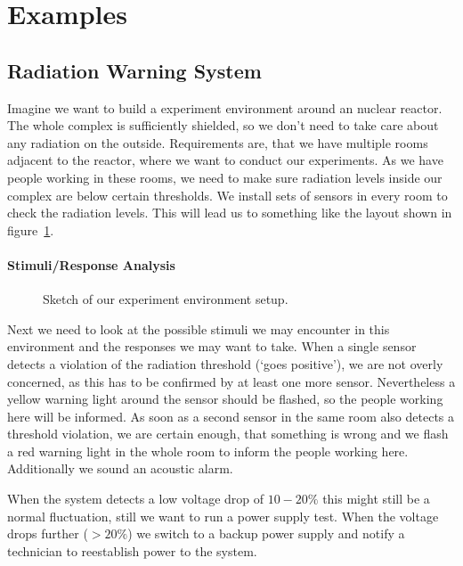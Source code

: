 \documentclass[10pt,a4paper,titlepage,draft]{article} %
\begin{document}
\section{Examples}

\subsection{Radiation Warning System}
Imagine we want to build a experiment environment around an nuclear reactor.
The whole complex is sufficiently shielded, so we don't need to take care about any radiation on the outside.
Requirements are, that we have multiple rooms adjacent to the reactor, where we want to conduct our experiments.
As we have people working in these rooms, we need to make sure radiation levels inside our complex are below certain thresholds.
We install sets of sensors in every room to check the radiation levels.
This will lead us to something like the layout shown in figure~\ref{fig:radWarner}.

\paragraph{Stimuli/Response Analysis}
\begin{figure}[htbp]
\centering

\caption{Sketch of our experiment environment setup.}
\label{fig:radWarner}
\end{figure}
Next we need to look at the possible stimuli we may encounter in this environment and the responses we may want to take.
When a single sensor detects a violation of the radiation threshold (`goes positive'), we are not overly concerned, as this has to be confirmed by at least one more sensor.
Nevertheless a yellow warning light around the sensor should be flashed, so the people working here will be informed.
As soon as a second sensor in the same room also detects a threshold violation, we are certain enough, that something is wrong and we flash a red warning light in the whole room to inform the people working here.
Additionally we sound an acoustic alarm.

When the system detects a low voltage drop of $10-20\%$ this might still be a normal fluctuation, still we want to run a power supply test.
When the voltage drops further ($>20\%$) we switch to a backup power supply and notify a technician to reestablish power to the system.
\end{document}
